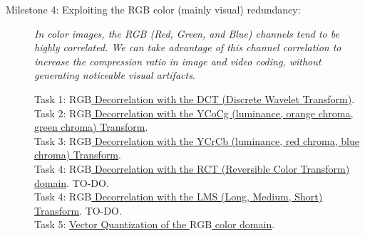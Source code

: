 \begin{description}
 \item [Milestone 4: {\normalfont Exploiting the RGB color (mainly
     visual) redundancy:}] \emph{In color images, the RGB (Red, Green,
 and Blue) channels tend to be highly correlated. We can take
 advantage of this channel correlation to increase the compression
 ratio in image and video coding, without generating noticeable visual
 artifacts}.
   \begin{description}
   \item [Task 1: {\normalfont
       \href{https://sistemas-multimedia.github.io/contents/RGB_DCT_SQ/}{$\text{RGB}$
         Decorrelation with the DCT (Discrete Wavelet Transform)}.}]
   \item [Task 2: {\normalfont
       \href{https://sistemas-multimedia.github.io/contents/YCoCg_SQ/}{$\text{RGB}$
         Decorrelation with the YCoCg (luminance, orange chroma, green
         chroma) Transform}.}]
   \item [Task 3: {\normalfont
       \href{https://sistemas-multimedia.github.io/contents/YCrCb_SQ/}{$\text{RGB}$
         Decorrelation with the YCrCb (luminance, red chroma, blue
         chroma) Transform}.}]
   \item [Task 4: {\normalfont
       \href{https://sistemas-multimedia.github.io/contents/RCT_SQ/}{$\text{RGB}$
         Decorrelation with the
         \href{https://en.wikipedia.org/wiki/JPEG_2000\#Color_components_transformation}{RCT
           (Reversible Color Transform) domain}}. TO-DO.}]
   \item [Task 4: {\normalfont
       \href{https://sistemas-multimedia.github.io/contents/LMS_SQ/}{$\text{RGB}$
         Decorrelation with the \href{https://en.wikipedia.org/wiki/LMS}{LMS
           (Long, Medium, Short}) Transform}. TO-DO.}]
   \item [Task 5: {\normalfont
       \href{https://sistemas-multimedia.github.io/contents/RGB_VQ/}{Vector
         Quantization of the $\text{RGB}$ color domain}.}]
   \end{description}
   ~\newline
   

\end{description}

